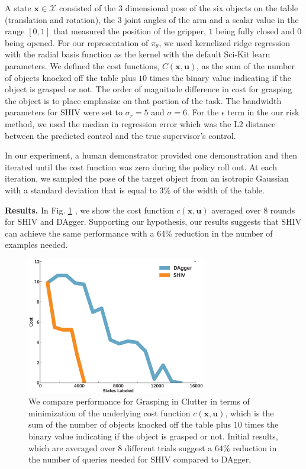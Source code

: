 \documentclass[10pt, conference]{ieeeconf}      %
\newcommand{\bu}{\mathbf{u}}
\newcommand{\bx}{\mathbf{x}}
\begin{document}
A state $\bx\in \mathcal{X}$ consisted of the 3 dimensional pose of the six objects on the table (translation and rotation), the 3 joint angles of the arm and a scalar value in the range $[0,1]$ that measured the position of the gripper, $1$ being fully closed and $0$ being opened. For our representation of $\pi_{\theta}$, we used kernelized ridge regression with the radial basis function as the kernel with the default Sci-Kit learn parameters. We defined the cost functions, $C(\bx,\bu)$, as the sum of the number of objects knocked off the table plus $10$ times the binary value indicating if the object is grasped or not. The order of magnitude difference in cost for grasping the object is to place emphasize on that portion of the task. The bandwidth parameters for SHIV were set to $\sigma_r = 5$ and $\sigma = 6$. For the $\epsilon$ term in the our risk method, we used the median in regression error which was the L2 distance between the predicted control and the true supervisor's control. 

In our experiment, a human demonstrator provided one demonstration and then iterated until the cost function was zero during the policy roll out. At each iteration, we sampled the pose of the target object from an isotropic Gaussian with a standard deviation that is equal to $3\%$ of the width of the table. 

\noindent\textbf{Results.} In Fig. \ref{fig:grasp_cost} , we show the cost function $c(\bx,\bu)$ averaged over 8 rounds for SHIV and DAgger. Supporting our hypothesis, our results suggests that SHIV can achieve the same performance with a 64\% reduction in the number of examples needed.

\begin{figure}[t!]
\centering
\includegraphics[width=\columnwidth, height=6cm]{figures/grasp_clutter.eps}
\caption{We compare performance for Grasping in Clutter in terms of minimization of the underlying cost function $c(\bx,\bu)$, which is the sum of the number of objects knocked off the table plus 10 times the binary value indicating if the object is grasped or not. Initial results, which are averaged over 8 different trials suggest a $64\%$ reduction in the number of queries needed for SHIV compared to DAgger,}
\vspace*{-10pt}
\label{fig:grasp_cost}
\end{figure}
\end{document}

